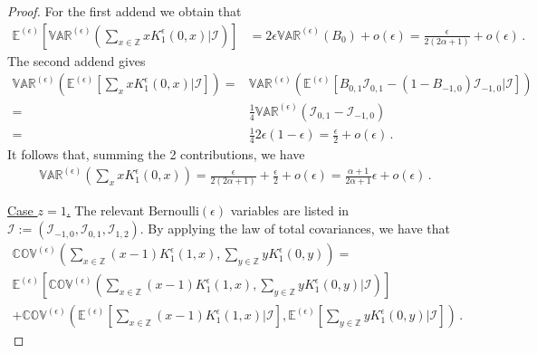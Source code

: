 \documentclass[10pt,a4paper]{amsart}
\begin{document}
\begin{proof}
For the first addend we obtain that 
\begin{equation*}
	\begin{split}
		\mathbb{E}^{(\epsilon)}\left[\mathbb{VAR}^{(\epsilon)}\left(\sum_{x\in \mathbb{Z}}xK_{1}^{\epsilon}(0,x)\bigg| \bm{\mathcal{I}}\right)\right]&= 
		2\epsilon \mathbb{VAR}^{(\epsilon)}(B_{0})+o(\epsilon)
		=
		\frac{\epsilon}{2(2\alpha+1)}+o(\epsilon)\,.
	\end{split}
\end{equation*}
{\color{black} The second addend gives
\begin{equation}
	\begin{split}
		\mathbb{VAR}^{(\epsilon)}\left(\mathbb{E}^{(\epsilon)}\left[\sum_{x}xK_{1}^{\epsilon}(0,x)\bigg|\mathbb{\mathcal{I}}\right]\right)=& \mathbb{VAR}^{(\epsilon)}\left(\mathbb{E}^{(\epsilon)}\left[B_{0,1}\mathcal{I}_{0,1}-(1-B_{-1,0})\mathcal{I}_{-1,0}\bigg|\mathbf{\mathcal{I}}\right]\right)
		\\=&\frac{1}{4}\mathbb{VAR}^{(\epsilon)}(\mathcal{I}_{0,1}-\mathcal{I}_{-1,0})
		\\=&\frac{1}{4}2\epsilon(1-\epsilon)=\frac{\epsilon}{2}+o(\epsilon)\,.
	\end{split}
\end{equation}
It follows that, summing the 2 contributions, we have
\begin{equation}
	\begin{split}
		\mathbb{VAR}^{(\epsilon)}\left(\sum_{x}xK_{1}^{\epsilon}(0,x)\right)= \frac{\epsilon}{2(2\alpha+1)}+\frac{\epsilon}{2}+o(\epsilon)= \frac{\alpha+1}{2\alpha+1}\epsilon+o(\epsilon)\,.
	\end{split}
\end{equation}}
\item{\underline{Case $z=1$.}} The relevant $\text{Bernoulli}(\epsilon)$ variables are listed in $\bm{\mathcal{I}}:=(\mathcal{I}_{-1,0},\mathcal{I}_{0,1},\mathcal{I}_{1,2})$. By applying the law of total covariances, we have that 
\begin{multline*}
		\mathbb{COV}^{(\epsilon)}\left(\sum_{x\in \mathbb{Z}}(x-1)K_{1}^{\epsilon}(1,x),\sum_{y\in \mathbb{Z}}yK_{1}^{\epsilon}(0,y)\right)
		=\\
		\mathbb{E}^{(\epsilon)}\left[\mathbb{COV}^{(\epsilon)}\left(\sum_{x\in \mathbb{Z}}(x-1)K_{1}^{\epsilon}(1,x),\sum_{y\in \mathbb{Z}}yK_{1}^{\epsilon}(0,y)\bigg|\bm{\mathcal{I}}\right)\right]
		\\+\mathbb{COV}^{(\epsilon)}\left(\mathbb{E}^{(\epsilon)}\left[\sum_{x\in \mathbb{Z}}(x-1)K_{1}^{\epsilon}(1,x)\bigg|\bm{\mathcal{I}}\right],\mathbb{E}^{(\epsilon)}\left[\sum_{y\in \mathbb{Z}}yK_{1}^{\epsilon}(0,y)\bigg|\bm{\mathcal{I}}\right]\right)\,.

\end{multline*}
\end{proof}
\end{document}
